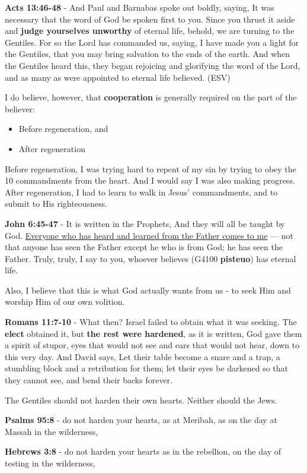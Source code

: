 \documentclass[11pt]{article}
\begin{document}
\textbf{Acts 13:46-48} - And Paul and Barnabas spoke out boldly, saying, It was necessary that the word of God be spoken first to you.  Since you thrust it aside and \textbf{judge yourselves unworthy} of eternal life, behold, we are turning to the Gentiles.  For so the Lord has commanded us, saying, I have made you a light for the Gentiles, that you may bring salvation to the ends of the earth.  And when the Gentiles heard this, they began rejoicing and glorifying the word of the Lord, and as many as were appointed to eternal life believed. (ESV)

I do believe, however, that \textbf{cooperation} is generally required on the part of the believer:
\begin{itemize}
\item Before regeneration, and
\item After regeneration
\end{itemize}

Before regeneration, I was trying hard to repent of my sin by trying to obey the 10 commandments from the heart.
And I would say I was also making progress.
After regeneration, I had to learn to walk in Jesus' commandments, and to submit to His righteousness.

\textbf{John 6:45-47} - It is written in the Prophets, And they will all be taught by God. \uline{Everyone who has heard and learned from the Father comes to me} — not that anyone has seen the Father except he who is from God; he has seen the Father. Truly, truly, I say to you, whoever believes (G4100 \textbf{pisteuo}) has eternal life.

Also, I believe that this is what God actually wants from us - to seek Him and worship Him of our own volition.

\textbf{Romans 11:7-10} - What then? Israel failed to obtain what it was seeking. The \textbf{elect} obtained it, but \textbf{the rest were hardened}, as it is written, God gave them a spirit of stupor, eyes that would not see and ears that would not hear, down to this very day.  And David says, Let their table become a snare and a trap, a stumbling block and a retribution for them; let their eyes be darkened so that they cannot see, and bend their backs forever.

The Gentiles should not harden their own hearts. Neither should the Jews.

\textbf{Psalms 95:8} - do not harden your hearts, as at Meribah, as on the day at Massah in the wilderness,

\textbf{Hebrews 3:8} - do not harden your hearts as in the rebellion, on the day of testing in the wilderness,
\end{document}

